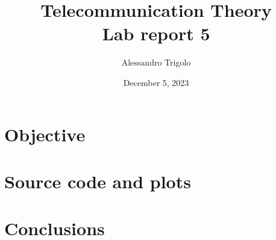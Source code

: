 \title{\vspace{160px} \textbf{\huge{Telecommunication Theory}} \\\vspace{17.5px} \LARGE{Lab report 5}  \vspace{10px}}
\author{Alessandro Trigolo}
\date{December 5, 2023}


\maketitle \newpage

\section*{Objective}


\section*{Source code and plots}



\section*{Conclusions}






